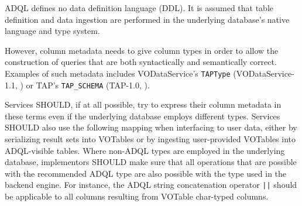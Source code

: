 \documentclass[11pt,a4paper]{ivoa}
\begin{document}
ADQL defines no data definition language (DDL).
It is assumed that table definition and data ingestion are performed in
the underlying database's native language and type system.

However, column metadata needs to give column types in order to allow the
construction of queries that are both syntactically and semantically correct.
Examples of such metadata includes VODataService's \verb:TAPType:
(VODataService-1.1, \citet{std:VODS11}) or TAP's \verb:TAP_SCHEMA: (TAP-1.0, \citet{std:TAP}).

Services SHOULD, if at all possible, try to express their column metadata in
these terms even if the underlying database employs different types.
Services SHOULD also use the following mapping when interfacing to user data,
either by serializing result sets into VOTables or by ingesting user-provided
VOTables into ADQL-visible tables.
Where non-ADQL types are employed in the underlying database, implementors
SHOULD make sure that all operations that are possible with the recommended
ADQL type are also possible with the type used in the backend engine.
For instance, the ADQL string concatenation operator \verb:||: should be
applicable to all columns resulting from VOTable char-typed columns.
\end{document}
